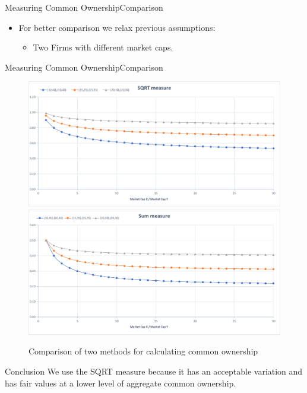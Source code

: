 \documentclass{beamer}
\begin{document}
	
	
	\begin{frame}{Measuring Common Ownership}{Comparison}
		\begin{itemize}
			\item For better comparison we relax previous assumptions:
			\begin{itemize}
				\item Two Firms with different market caps.
			\end{itemize}
		\end{itemize}
		\resizebox{0.7\textwidth}{!}
		{
			
		}
		
		
	\end{frame}
	
	
	\begin{frame}{Measuring Common Ownership}{Comparison}
		\begin{figure}[htbp]
			\includegraphics[width=0.47\linewidth]{3.png}
			\includegraphics[width=0.47\linewidth]{4.png}
			\captionsetup{labelformat=empty}
			\caption{\scriptsize Comparison of two methods for calculating common ownership}
		\end{figure}
		\begin{block}{Conclusion}
			We use the SQRT measure because it has an acceptable variation and has fair values at a lower level of aggregate common ownership. 
		\end{block}
	\end{frame}
	
	
\end{document}
